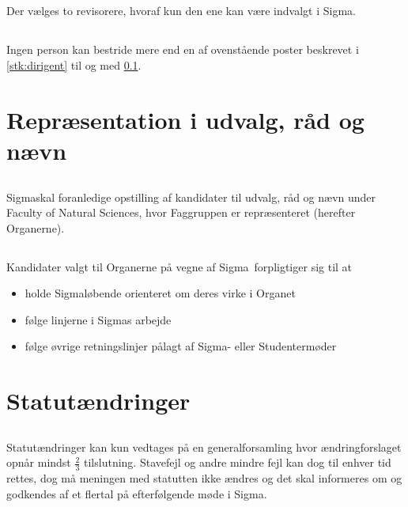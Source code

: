 \documentclass[danish,a4paper,twocolumn]{article}
\newcommand{\foreningen}{Sigma}
\newcommand{\fakultetet}{Faculty of Natural Sciences}
\begin{document}
\subsection{}\label{stk:revisorer}Der vælges to revisorere, hvoraf kun den ene kan være indvalgt i \foreningen.
\subsection{}Ingen person kan bestride mere end en af ovenstående poster beskrevet i \ref{stk:dirigent} til og med \ref{stk:revisorer}.

\section{Repræsentation i udvalg, råd og nævn}
\subsection{}\foreningen skal foranledige opstilling af kandidater til udvalg, råd og nævn under \fakultetet, hvor Faggruppen er repræsenteret (herefter Organerne).

\subsection{}Kandidater valgt til Organerne på vegne af \foreningen\ forpligtiger sig til at
\begin{itemize}
        \item holde \foreningen løbende orienteret om deres virke i Organet
        \item følge linjerne i \foreningen s arbejde
        \item følge øvrige retningslinjer pålagt af \foreningen- eller Studentermøder
\end{itemize}

\section{Statutændringer}\label{par:aendringer}
\subsection{}Statutændringer kan kun vedtages på en generalforsamling hvor ændringforslaget opnår mindst $\frac{2}{3}$ tilslutning. Stavefejl og andre mindre fejl kan dog til enhver tid rettes, dog må meningen med statutten ikke ændres og det skal informeres om og godkendes af et flertal på efterfølgende møde i \foreningen.
\end{document}
